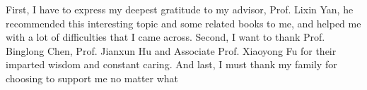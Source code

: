 \noindent
First, I have to express my deepest gratitude to my advisor, Prof. Lixin Yan, he recommended this interesting topic and some related books to me, and helped me with a lot of difficulties that I came across. Second, I want to thank Prof. Binglong Chen, Prof. Jianxun Hu and Associate Prof. Xiaoyong Fu for their imparted wisdom and constant caring. And last, I must thank my family for choosing to support me no matter what